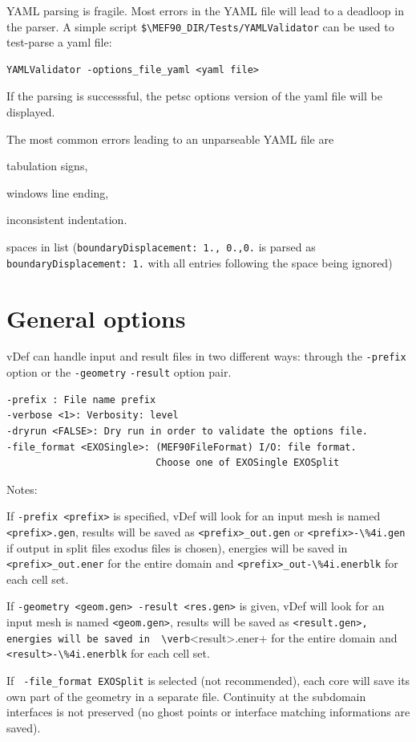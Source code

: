\documentclass[10pt,oneside]{report}
\begin{document}
YAML parsing is fragile.  Most errors in the YAML file will lead to a deadloop in the parser. A simple script \verb+$\MEF90_DIR/Tests/YAMLValidator+ can be used to test-parse a yaml file:
\begin{Verbatim}
YAMLValidator -options_file_yaml <yaml file>
\end{Verbatim}
If the parsing is successsful, the petsc options version of the yaml file will be displayed.

The most common errors leading to an unparseable YAML file are
\begin{compactenum}
    \item tabulation signs,
    \item windows line ending,
    \item inconsistent indentation.
    \item spaces in list (\verb+boundaryDisplacement: 1., 0.,0.+ is parsed as \verb+boundaryDisplacement: 1.+ with all entries following the space being ignored)

\end{compactenum}

\section{General options}

vDef can handle input and result files in two different ways: through the \verb+-prefix+ option or the \verb+-geometry+ \verb+-result+ option pair.

\begin{Verbatim}
-prefix : File name prefix
-verbose <1>: Verbosity: level 
-dryrun <FALSE>: Dry run in order to validate the options file. 
-file_format <EXOSingle>: (MEF90FileFormat) I/O: file format. 
                          Choose one of EXOSingle EXOSplit
\end{Verbatim}
Notes: 
\begin{compactenum}
    \item  If \verb+-prefix <prefix>+ is specified, vDef will look for an input mesh is named \verb+<prefix>.gen+, results will be saved as \verb+<prefix>_out.gen+ or \verb+<prefix>-\%4i.gen+ if output in split files exodus files is chosen), energies will be saved in  \verb+<prefix>_out.ener+ for the entire domain and \verb+<prefix>_out-\%4i.enerblk+ for each cell set.
    \item If \verb+-geometry <geom.gen> -result <res.gen>+ is given, vDef will look for an input mesh is named \verb+<geom.gen>+, results will be saved as \verb+<result.gen>, energies will be saved in  \verb+<result>.ener+ for the entire domain and \verb+<result>-\%4i.enerblk+ for each cell set.
    \item If \verb+ -file_format EXOSplit+ is selected (not recommended), each core will save its own part of the geometry in a separate file. Continuity at the subdomain interfaces is not preserved (no ghost points or interface matching informations are saved).
\end{compactenum}
\end{document}
